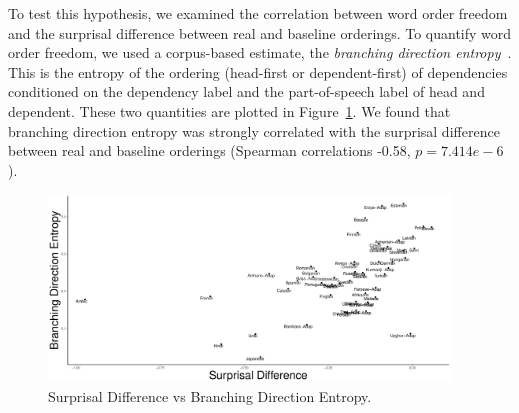 To test this hypothesis, we examined the correlation between word order freedom and the surprisal difference between real and baseline orderings.
To quantify word order freedom, we used a corpus-based estimate, the \emph{branching direction entropy}~\citep{futrell-quantifying-2015}.
This is the entropy of the ordering (head-first or dependent-first) of dependencies conditioned on the dependency label and the part-of-speech label of head and dependent.
These two quantities are plotted in Figure~\ref{fig:hist-real}.
We found that branching direction entropy was strongly correlated with the surprisal difference between real and baseline orderings (Spearman correlations -0.58, $p = 7.414e-6$).




\begin{figure}
\includegraphics[width=0.95\textwidth]{figures/surprisal-branching-entropy-REAL.pdf}
	\caption{Surprisal Difference vs Branching Direction Entropy.}\label{fig:hist-real}
\end{figure}




